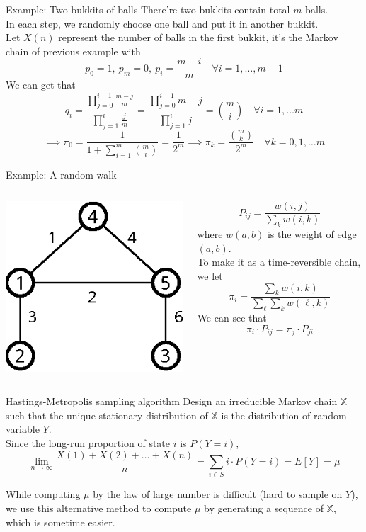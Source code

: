 \documentclass[mathserif]{beamer}
\begin{document}
\begin{frame}{Example: Two bukkits of balls}
There're two bukkits contain total $m$ balls.\\
In each step, we randomly choose one ball and put it in another bukkit.\\
Let $X(n)$ represent the number of balls in the first bukkit, it's the Markov chain of previous example with
\[
p_0 = 1,~p_m = 0,~p_i = \frac{m-i}{m} \quad\forall i=1,\ldots,m-1
\]
We can get that
\[
q_i = \frac{\prod_{j=0}^{i-1}\frac{m-j}{m}}{\prod_{j=1}^{i}\frac{j}{m}} = 
\frac{\prod_{j=0}^{i-1}m-j}{\prod_{j=1}^{i}j} = \binom{m}{i} \quad\forall i=1,\ldots m
\]
\[
\implies \pi_0 = \frac{1}{1 + \sum_{i=1}^m \binom{m}{i}} = 
\frac{1}{2^m} \implies \pi_k = \frac{\binom{m}{k}}{2^m} \quad\forall k=0,1,\ldots m
\]
\end{frame}

\begin{frame}{Example: A random walk}
\begin{columns}
\begin{column}{0.4\textwidth}
\begin{center}
\includegraphics[scale=1.0]{random_walk}
\end{center}
\end{column}
\begin{column}{0.6\textwidth}
\[
P_{ij} = \frac{w(i,j)}{\sum_k w(i,k)}
\]
where $w(a,b)$ is the weight of edge $(a,b)$.\\
To make it as a time-reversible chain, we let
\[
\pi_i = \frac{\sum_k w(i,k)}{\sum_\ell \sum_k w(\ell,k)}
\]
We can see that
\[
\pi_i\cdot P_{ij} = \pi_j\cdot P_{ji}
\]
\end{column}
\end{columns}
\end{frame}

\begin{frame}{Hastings-Metropolis sampling algorithm}
Design an irreducible Markov chain $\mathbb{X}$ such that the unique stationary distribution of $\mathbb{X}$ is the distribution of random variable $Y$.\\
Since the long-run proportion of state $i$ is $P(Y=i)$,
\[
\lim_{n\to\infty} \frac{X(1)+X(2)+\ldots+X(n)}{n} = \sum_{i\in S} i\cdot P(Y=i) = E[Y] = \mu
\]

While computing $\mu$ by the law of large number is difficult (hard to sample on $Y$), we use this alternative method to compute $\mu$ by generating a sequence of $\mathbb{X}$, which is sometime easier.
\end{frame}
\end{document}
